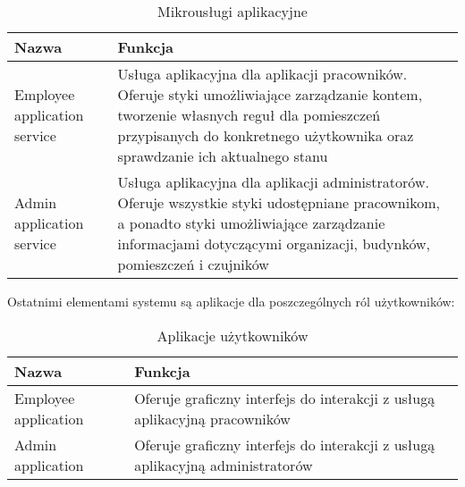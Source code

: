     \begin{xltabular}{1\textwidth} { 
        | >{\raggedright\arraybackslash}X        
        | >{\raggedleft\arraybackslash}X | }
        \caption{Mikrousługi aplikacyjne} \label{tab:mikrouslugi-aplikacyjne} \\
        \hline
       Nazwa & Funkcja \\
       \hline
       Employee application service & 
       Usługa aplikacyjna dla aplikacji pracowników. Oferuje styki umożliwiające 
       zarządzanie kontem, tworzenie własnych reguł dla pomieszczeń przypisanych do 
       konkretnego użytkownika oraz sprawdzanie ich aktualnego stanu \\
       \hline
       Admin application service &
       Usługa aplikacyjna dla aplikacji administratorów. Oferuje wszystkie styki 
       udostępniane pracownikom, a ponadto styki umożliwiające zarządzanie informacjami 
       dotyczącymi organizacji, budynków, pomieszczeń i czujników \\
       \hline
    \end{xltabular}

Ostatnimi elementami systemu są aplikacje dla poszczególnych ról użytkowników:

    \begin{xltabular}{1\textwidth} { 
        | >{\raggedright\arraybackslash}X        
        | >{\raggedleft\arraybackslash}X | }
        \caption{Aplikacje użytkowników} \label{tab:aplikacje-uzytkownikow} \\
        \hline
       Nazwa & Funkcja \\
       \hline
       Employee application & 
       Oferuje graficzny interfejs do interakcji z usługą aplikacyjną pracowników \\
       \hline
       Admin application &
       Oferuje graficzny interfejs do interakcji z usługą aplikacyjną administratorów \\
       \hline
    \end{xltabular}